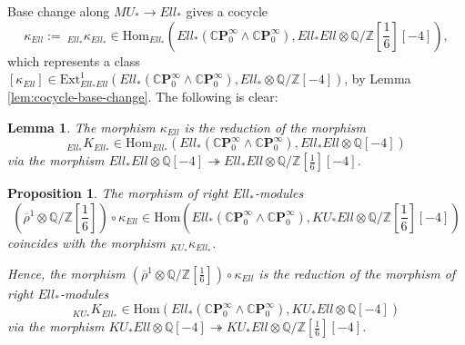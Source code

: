 \documentclass[10pt,a4paper]{amsart}
\newtheorem{prop}[thm]{Proposition}
\newtheorem{lem}[thm]{Lemma}
\theoremstyle{definition}
\theoremstyle{remark}
\newcommand{\rhobar}{\overline{\rho}}
\newcommand{\qz}{{\rat/\zed}}
\newcommand{\qzsix}{{\rat/\zed[{\scriptstyle{\frac{1}{6}}}]}}
\renewcommand{\hom}{\mathrm{Hom}}
\newcommand{\ext}{\mathrm{Ext}}
\newcommand{\zed}{\mathbb{Z}}
\newcommand{\rat}{\mathbb{Q}}
\newcommand{\tmf}{{Ell}}
\newcommand{\tmfcoeff}{{Ell}}
\newcommand{\cp}{\mathbb{C} \mathbf{P}^\infty}
\renewcommand{\smash}{\wedge}
\begin{document}
Base change along $MU_* \rightarrow \tmfcoeff_*$ gives a cocycle
\[
\kappa_{\tmf} :=\  _{\tmfcoeff_*}\kappa _{\tmfcoeff_*} \in \hom_{\tmfcoeff_*}
(\tmfcoeff_*(\cp_0 \smash \cp_0) ,
\tmfcoeff_* \tmfcoeff \otimes \qzsix [-4]),
\]
which represents a class $[\kappa_{\tmf}] \in \ext^1 _{\tmfcoeff_*\tmfcoeff} (\tmfcoeff_* (\cp_0 \smash \cp_0), \tmfcoeff_* \otimes \qz[-4])$,
by Lemma \ref{lem:cocycle-base-change}. The following is clear:

\begin{lem}
\label{lem:kappa_ell_Xi}
The morphism $\kappa_{\tmf}$ is the reduction of the morphism
\[
_{\tmfcoeff_*}K_{\tmfcoeff_*} \in
 \hom_{\tmfcoeff_*} (\tmfcoeff_*(\cp_0 \smash \cp_0) ,
\tmfcoeff_* \tmfcoeff \otimes \rat [-4])
\]
 via the morphism
$\tmfcoeff_* \tmfcoeff \otimes \rat [-4] \twoheadrightarrow \tmfcoeff_* \tmfcoeff\otimes \qzsix
[-4]$.
\end{lem}



\begin{prop}
\label{prop:kappa-tmf}
	The morphism of right $\tmfcoeff_*$-modules
\[
(\rhobar^1 \otimes \qzsix ) \circ \kappa_\tmf \in \hom
(\tmfcoeff_*(\cp_0 \smash \cp_0) ,
KU_* \tmfcoeff \otimes \qzsix [-4])
\]
 coincides with the morphism $_{KU_*} \kappa _{\tmfcoeff_*}$.

Hence, the morphism $(\rhobar^1 \otimes \qzsix ) \circ \kappa_\tmf$ is the reduction
of the morphism of right $\tmfcoeff_*$-modules
\[_{KU_*}K_{\tmfcoeff_*} \in \hom (\tmfcoeff_*
 (\cp_0\smash \cp_0) , KU_* \tmfcoeff\otimes \rat [-4])
\]
 via the morphism
$KU_* \tmfcoeff\otimes \rat [-4] \twoheadrightarrow KU_* \tmfcoeff \otimes \qzsix
[-4]$.
\end{prop}
\end{document}
